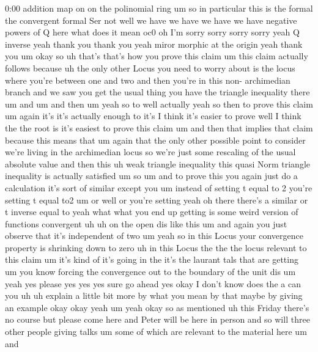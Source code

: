 \begin{unfinished}{0:00}
addition  map  on  on  the  polinomial  ring
um  so  in  particular  this  is  the
formal  the  convergent  formal  Ser
not
well  we  have  we  have  we  have  we  have
negative  powers  of  Q  here  what  does  it
mean
oc0  oh  I'm  sorry  sorry  sorry  sorry  yeah
Q  inverse  yeah  thank  you  thank  you  yeah
miror  morphic  at  the  origin  yeah  thank
you  um  okay  so  uh  that's  that's  how  you
prove  this
claim  um  this  claim  actually  follows
because  uh  the  only  other  Locus  you  need
to  worry  about  is  the  locus  where  you're
between  one  and  two  and  then  you're  in
this  non-  archimedian  branch  and  we  saw
you  get  the  usual  thing  you  have  the
triangle  inequality
there
um  and  um  and  then  um  yeah  so  to  well
actually  yeah  so  then  to  prove  this
claim
um  again  it's  it's  actually  enough  to
it's  I  think  it's  easier  to  prove  well  I
think  the  the  root  is  it's  easiest  to
prove  this  claim  um  and  then  that
implies  that  claim  because  this  means
that  um  again  that  the  only  other
possible  point  to  consider  we're  living
in  the  archimedian  locus  so  we're  just
some  rescaling  of  the  usual  absolute
value  and  then  this  uh  weak  triangle
inequality  this  quasi  Norm  triangle
inequality  is  actually
satisfied  um
so  um  and  to  prove  this  you  again  just
do  a  calculation  it's  sort  of  similar
except  you  um  instead  of  setting  t  equal
to  2  you're  setting  t  equal  to2  um  or
well  or  you're  setting  yeah  oh  there
there's  a  similar  or  t  inverse  equal  to
yeah  what  what  you  end  up  getting  is
some  weird  version  of  functions
convergent  uh  uh  on  the  open  dis  like
this  um  and  again  you  just  observe  that
it's  independent  of
two
um  yeah  so  in  this  Locus  your
convergence  property  is  shrinking  down
to  zero
uh  in  this  Locus  the  the  the  locus
relevant  to  this  claim  um  it's  kind  of
it's  going  in  the  it's  the  laurant  tals
that  are  getting  um  you  know  forcing  the
convergence  out  to  the  boundary  of  the
unit
dis  um  yeah  yes  please  yes  yes  yes  sure
go  ahead  yes  okay  I  don't
know  does  the
a  can  you  uh  uh  explain  a  little  bit
more  by  what  you  mean  by  that  maybe  by
giving  an
example  okay  okay
yeah  um  yeah  okay  so  as  mentioned  uh
this  Friday  there's  no  course  but  please
come  here  and  Peter  will  be  here  in
person  and  so  will  three  other  people
giving  talks  um  some  of  which  are
relevant  to  the  material  here  um  and

\end{unfinished}
